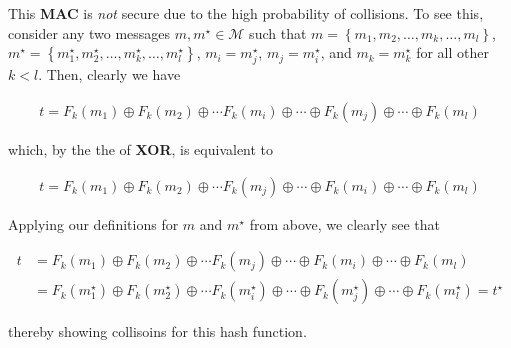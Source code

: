 \documentclass[../midterm.tex]{subfiles}
\begin{document}
\begin{flushleft}




  This \textbf{MAC} is \emph{not} secure due to the high probability of collisions.  To see this, consider any two messages $m, m^\star \in \mathcal{M}$ such that $m = \left\{ m_1, m_2, \dots, m_k, \dots, m_l \right\}$, $m^\star = \left\{ m_1^\star, m_2^\star, \dots, m_k^\star, \dots, m_l^\star \right\}$, $m_i = m^\star_j$, $m_j = m^\star_i$, and $m_k = m^\star_k$ for all other $k < l$.  Then, clearly we have

\begin{align*}
t = F_k \left( m_1 \right) \oplus F_k \left( m_2 \right) \oplus \cdots F_k \left( m_i \right) \oplus \cdots \oplus F_k \left( m_j \right) \oplus \cdots \oplus F_k \left( m_l \right)
\end{align*}

which, by the the of \textbf{XOR}, is equivalent to 

\begin{align*}
t = F_k \left( m_1 \right) \oplus F_k \left( m_2 \right) \oplus \cdots F_k \left( m_j \right) \oplus \cdots \oplus F_k \left( m_i \right) \oplus \cdots \oplus F_k \left( m_l \right)
\end{align*}

Applying our definitions for $m$ and $m^\star$ from above, we clearly see that

\begin{align*}
t &= F_k \left( m_1 \right) \oplus F_k \left( m_2 \right) \oplus \cdots F_k \left( m_j \right) \oplus \cdots \oplus F_k \left( m_i \right) \oplus \cdots \oplus F_k \left( m_l \right) \\
&= F_k \left( m^\star_1 \right) \oplus F_k \left( m^\star_2 \right) \oplus \cdots F_k \left( m^\star_i \right) \oplus \cdots \oplus F_k \left( m^\star_j \right) \oplus \cdots \oplus F_k \left( m^\star_l \right) = t^\star
\end{align*}

thereby showing collisoins for this hash function. \newline




\end{flushleft}
\end{document}
